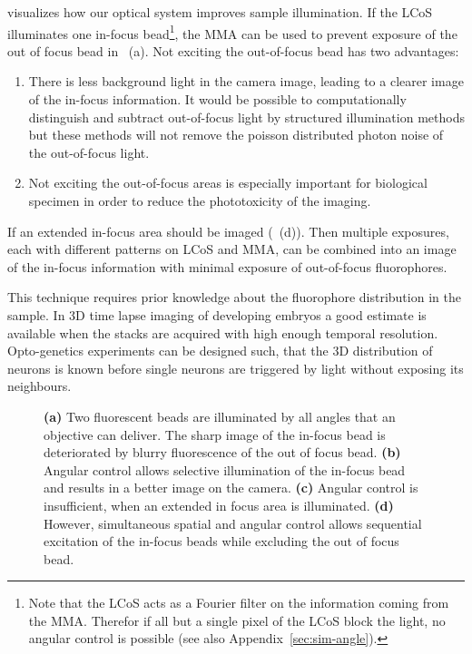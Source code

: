  visualizes how our optical system improves
sample illumination. If the LCoS illuminates one in-focus
bead\footnote{Note that the LCoS acts as a Fourier filter on the
  information coming from the MMA. Therefor if all but a single pixel
  of the LCoS block the light, no angular control is possible (see
  also Appendix~\ref{sec:sim-angle}).}, the MMA can be used to prevent
exposure of the out of focus bead in
~(a). Not exciting the out-of-focus bead has
two advantages:
\begin{enumerate}
\item There is less background light in the camera image, leading to a
  clearer image of the in-focus information. It would be possible to
  computationally distinguish and subtract out-of-focus light by
  structured illumination methods but these methods will not remove
  the poisson distributed photon noise of the out-of-focus light.
\item Not exciting the out-of-focus areas is especially important for
  biological specimen in order to reduce the phototoxicity of the
  imaging.
\end{enumerate}
If an extended in-focus area should be imaged
(~(d)). Then multiple exposures, each with
different patterns on LCoS and MMA, can be combined into an image of
the in-focus information with minimal exposure of out-of-focus
fluorophores.

This technique requires prior knowledge about the fluorophore
distribution in the sample. In 3D time lapse imaging of developing
embryos a good estimate is available when the stacks are acquired with
high enough temporal resolution. Opto-genetics experiments can be
designed such, that the 3D distribution of neurons is known before
single neurons are triggered by light without exposing its neighbours.

\begin{figure}[!hbt]
  \centering
  \def\svgscale{.43}
  
  \caption{{\bf (a)} Two fluorescent beads are illuminated by all
    angles that an objective can deliver. The sharp image of the
    in-focus bead is deteriorated by blurry fluorescence of the out of
    focus bead. {\bf (b)} Angular control allows selective
    illumination of the in-focus bead and results in a better image on
    the camera. {\bf (c)} Angular control is insufficient, when an
    extended in focus area is illuminated. {\bf (d)} However,
    simultaneous spatial and angular control allows sequential
    excitation of the in-focus beads while excluding the out of focus
    bead.}
  \label{fig:hourglass-all}
\end{figure}
\newpage
